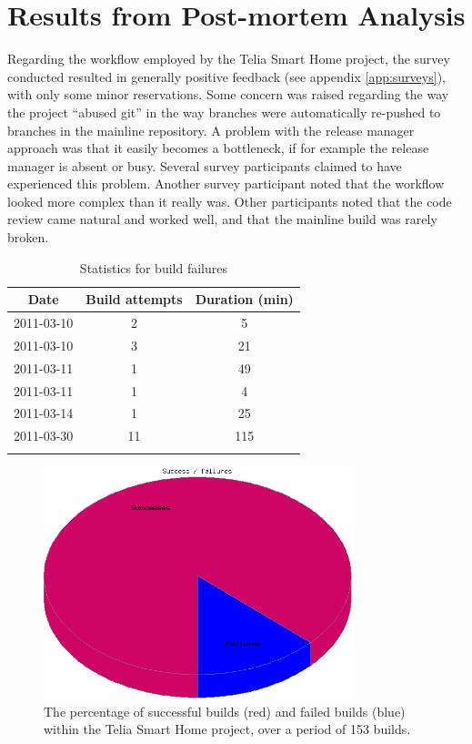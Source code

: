 \documentclass{llncs}
\begin{document}
\section{Results from Post-mortem Analysis}

Regarding the workflow employed by the Telia Smart Home project, the
survey conducted resulted in generally positive feedback (see appendix
\ref{app:surveys}), with only some minor reservations. Some concern was raised
regarding the way the project ``abused git'' in the way branches were
automatically re-pushed to branches in the mainline repository. A
problem with the release manager approach was that it easily becomes a
bottleneck, if for example the release manager is absent or
busy. Several survey participants claimed to have experienced this
problem. Another survey participant noted that the workflow looked
more complex than it really was. Other participants noted that the
code review came natural and worked well, and that the mainline build
was rarely broken.

\begin{table}[tp]
 \begin{center}
  \begin{tabular}{ccc}
   \toprule
   Date & Build attempts & Duration (min) \\
   \midrule
   2011-03-10 & 2 & 5 \\
   2011-03-10 & 3 & 21 \\
   2011-03-11 & 1 & 49 \\
   2011-03-11 & 1 & 4 \\
   2011-03-14 & 1 & 25 \\
   2011-03-30 & 11 & 115 \\
   \bottomrule
   \\[-0.7em]
  \end{tabular}
  \caption{Statistics for build failures}
  \label{tbl:breakage}
 \end{center}
\end{table}

\begin{figure}[tp]
 \begin{center}
  \includegraphics[width=0.8\textwidth]{binary-blobs/pie}
  \caption{The percentage of successful builds (red) and failed
           builds (blue) within the Telia Smart Home project, over a
           period of 153 builds.}
  \label{fig:successbuilds}
 \end{center}
\end{figure}
\end{document}
